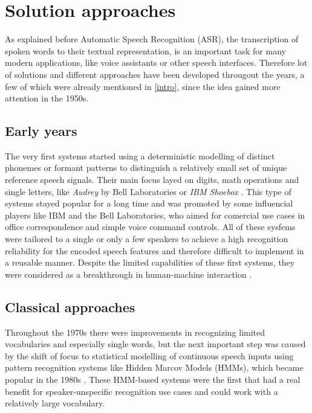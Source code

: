 \chapter{Solution approaches}
\label{solution}
As explained before Automatic Speech Recognition (ASR), the transcription of spoken words to their textual representation, is an important task for many modern applications, like voice assistants or other speech interfaces.
Therefore lot of solutions and different approaches have been developed througout the years, a few of which were already mentioned in \autoref{intro}, since the idea gained more attention in the 1950s.

\section{Early years}
The very first systems started using a deterministic modelling of distinct phonemes or formant patterns to distinguish a relatively small set of unique reference speech signals.
Their main focus layed on digits, math operations and single letters, like \textit{Audrey} by Bell Laboratories \cite{moskvitch2017machines} or \textit{IBM Shoebox} \cite{ibmhistory}.
This type of systems stayed popular for a long time and was promoted by some influencial players like IBM and the Bell Laboratories, who aimed for comercial use cases in office correspondence and simple voice command controls.
All of these sysfems were tailored to a single or only a few speakers to achieve a high recognition reliability for the encoded speech features \cite{joy2025approaches} and therefore difficult to implement in a reusable manner. 
Despite the limited capabilities of these first systems, they were considered as a breakthrough in human-machine interaction \cite{ibmhistory}.

\section{Classical approaches}
Throughout the 1970s there were improvements in recognizing limited vocabularies and especially single words, but the next important step was caused by the shift of focus to statistical modelling of continuous speech inputs using pattern recognition systems like Hidden Marcov Models (HMMs), which became popular in the 1980s \cite{kincaid2018history}.
These HMM-based systems were the first that had a real benefit for speaker-unspecific recognition use cases and could work with a relatively large vocabulary.

